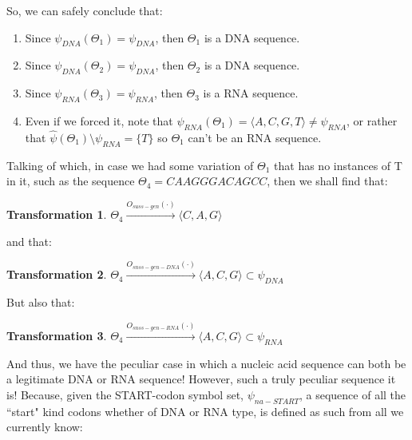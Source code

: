 \documentclass[a4paper, 18pt]{article} %
\newtheorem{trans}{Transformation}
\begin{document}
So, we can safely conclude that:

\begin{enumerate}
\item Since $\psi_{DNA}(\Theta_1) = \psi_{DNA}$, then $\Theta_1$ is a DNA sequence.
\item Since $\psi_{DNA}(\Theta_2) = \psi_{DNA}$, then $\Theta_2$ is a DNA sequence.
\item Since $\psi_{RNA}(\Theta_3) = \psi_{RNA}$, then $\Theta_3$ is a RNA sequence.
\item Even if we forced it, note that $\psi_{RNA}(\Theta_1) = \langle A, C, G, T \rangle \neq \psi_{RNA}$, or rather that $\hat{\psi}(\Theta_1) \setminus \psi_{RNA} = \{T\}$ so $\Theta_1$ can't be an RNA sequence.
\end{enumerate} 

Talking of which, in case we had some variation of $\Theta_1$ that has no instances of T in it, such as the sequence $\Theta_4 = CAAGGGACAGCC$, then we shall find that:

\begin{trans}
$\Theta_4 \xrightarrow{O_{suss-gen}(\cdot)} \langle C, A, G \rangle$
\end{trans}

and that:

\begin{trans}
$\Theta_4 \xrightarrow{O_{snss-gen-DNA}(\cdot)} \langle A, C, G \rangle \subset \psi_{DNA}$
\end{trans}

But also that:

\begin{trans}
$\Theta_4 \xrightarrow{O_{snss-gen-RNA}(\cdot)} \langle A, C, G \rangle \subset \psi_{RNA}$
\end{trans}

And thus, we have the peculiar case in which a nucleic acid sequence can both be a legitimate DNA or RNA sequence! However, such a truly peculiar sequence it is! Because, given the START-codon symbol set, $\psi_{na-START}$, a sequence of all the ``start" kind codons whether of DNA or RNA type, is defined as such from all we currently know:
\end{document}
